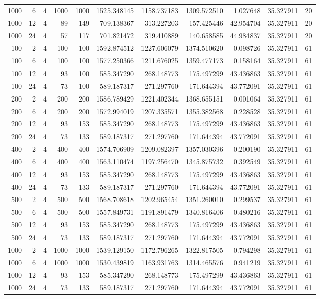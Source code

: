 \begin{table}
\begin{tabular}{rrrrrrrrrrr}
1000 & 6 & 4 & 1000 & 1000 & 1525.348145 & 1158.737183 & 1309.572510 & 1.027648 & 35.327911 & 20 \\
1000 & 12 & 4 & 89 & 149 & 709.138367 & 313.227203 & 157.425446 & 42.954704 & 35.327911 & 20 \\
1000 & 24 & 4 & 57 & 117 & 701.821472 & 319.410889 & 140.658585 & 44.984837 & 35.327911 & 20 \\
100 & 2 & 4 & 100 & 100 & 1592.874512 & 1227.606079 & 1374.510620 & -0.098726 & 35.327911 & 61 \\
100 & 6 & 4 & 100 & 100 & 1577.250366 & 1211.676025 & 1359.477173 & 0.158164 & 35.327911 & 61 \\
100 & 12 & 4 & 93 & 100 & 585.347290 & 268.148773 & 175.497299 & 43.436863 & 35.327911 & 61 \\
100 & 24 & 4 & 73 & 100 & 589.187317 & 271.297760 & 171.644394 & 43.772091 & 35.327911 & 61 \\
200 & 2 & 4 & 200 & 200 & 1586.789429 & 1221.402344 & 1368.655151 & 0.001064 & 35.327911 & 61 \\
200 & 6 & 4 & 200 & 200 & 1572.994019 & 1207.335571 & 1355.382568 & 0.228528 & 35.327911 & 61 \\
200 & 12 & 4 & 93 & 153 & 585.347290 & 268.148773 & 175.497299 & 43.436863 & 35.327911 & 61 \\
200 & 24 & 4 & 73 & 133 & 589.187317 & 271.297760 & 171.644394 & 43.772091 & 35.327911 & 61 \\
400 & 2 & 4 & 400 & 400 & 1574.706909 & 1209.082397 & 1357.030396 & 0.200190 & 35.327911 & 61 \\
400 & 6 & 4 & 400 & 400 & 1563.110474 & 1197.256470 & 1345.875732 & 0.392549 & 35.327911 & 61 \\
400 & 12 & 4 & 93 & 153 & 585.347290 & 268.148773 & 175.497299 & 43.436863 & 35.327911 & 61 \\
400 & 24 & 4 & 73 & 133 & 589.187317 & 271.297760 & 171.644394 & 43.772091 & 35.327911 & 61 \\
500 & 2 & 4 & 500 & 500 & 1568.708618 & 1202.965454 & 1351.260010 & 0.299537 & 35.327911 & 61 \\
500 & 6 & 4 & 500 & 500 & 1557.849731 & 1191.891479 & 1340.816406 & 0.480216 & 35.327911 & 61 \\
500 & 12 & 4 & 93 & 153 & 585.347290 & 268.148773 & 175.497299 & 43.436863 & 35.327911 & 61 \\
500 & 24 & 4 & 73 & 133 & 589.187317 & 271.297760 & 171.644394 & 43.772091 & 35.327911 & 61 \\
1000 & 2 & 4 & 1000 & 1000 & 1539.129150 & 1172.796265 & 1322.817505 & 0.794298 & 35.327911 & 61 \\
1000 & 6 & 4 & 1000 & 1000 & 1530.439819 & 1163.931763 & 1314.465576 & 0.941219 & 35.327911 & 61 \\
1000 & 12 & 4 & 93 & 153 & 585.347290 & 268.148773 & 175.497299 & 43.436863 & 35.327911 & 61 \\
1000 & 24 & 4 & 73 & 133 & 589.187317 & 271.297760 & 171.644394 & 43.772091 & 35.327911 & 61 \\
\bottomrule
\end{tabular}
\end{table}
